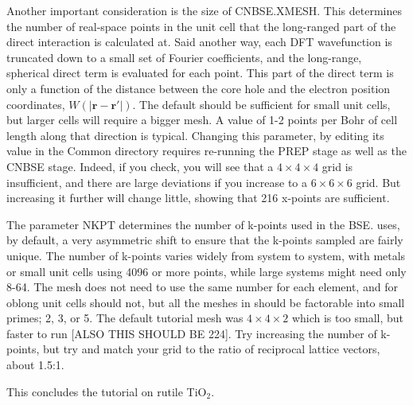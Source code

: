 \documentclass[11pt]{report}
\begin{document}
Another important consideration is the size of CNBSE.XMESH. This determines the number of real-space points in the unit cell that the long-ranged part of the direct interaction is calculated at. Said another way, each DFT wavefunction is truncated down to a small set of Fourier coefficients, and the long-range, spherical direct term is evaluated for each point. This part of the direct term is only a function of the distance between the core hole and the electron position coordinates, $W(|\mathbf{r-r'}|)$. The default should be sufficient for small unit cells, but larger cells will require a bigger mesh. A value of 1-2 points per Bohr of cell length along that direction is typical. 
Changing this parameter, by editing its value in the Common directory requires re-running the PREP stage as well as the CNBSE stage. 
Indeed, if you check, you will see that a $4\times4\times4$ grid is insufficient, and there are large deviations if you increase to a $6\times6\times6$ grid. But increasing it further will change little, showing that 216 x-points are sufficient. 


The parameter NKPT determines the number of k-points used in the BSE.  uses, by default, a very asymmetric shift to ensure that the k-points sampled are fairly unique. The number of k-points varies widely from system to system, with metals or small unit cells using 4096 or more points, while large systems might need only 8-64. The mesh does not need to use the same number for each element, and for oblong unit cells should not, but all the meshes in  should be factorable into small primes; 2, 3, or 5. The default tutorial mesh was $4\times4\times2$ which is too small, but faster to run [ALSO THIS SHOULD BE 224]. Try increasing the number of k-points, but try and match your grid to the ratio of reciprocal lattice vectors, about 1.5:1. 

This concludes the tutorial on rutile TiO$_2$.

\fi
\end{document}
